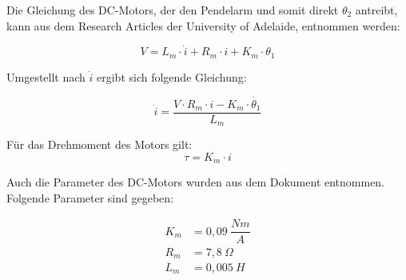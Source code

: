 Die Gleichung des DC-Motors, der den Pendelarm und somit direkt $\theta_2$ antreibt, kann aus dem Research Articles der University of Adelaide, entnommen werden:\citep{Cazzolato.2011}

\begin{equation}
V = L_m \cdot \dot{i} + R_m \cdot i + K_m \cdot \theta_1
\end{equation}

Umgestellt nach $ \dot{i}$ ergibt sich folgende Gleichung:

\begin{equation}
 \dot{i} = \dfrac{V \cdot R_m \cdot i - K_m \cdot \dot{\theta_1}}{L_m}
\end{equation}

Für das Drehmoment des Motors gilt:
\begin{equation}
\tau = K_m \cdot i 
\end{equation}

Auch die Parameter des DC-Motors wurden aus dem Dokument entnommen. Folgende Parameter sind gegeben:

\begin{align}
K_m &= 0,09 ~\dfrac{Nm}{A} \\
R_m &= 7,8  ~\Omega \\
L_m &= 0,005  ~H 
\end{align}